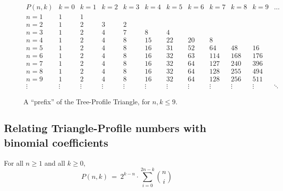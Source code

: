 \begin{figure}[htb]
\[
\begin{array}{c||r|r|r|r|r|r|r|r|r|r|r}
P(n, k) & k=0 & k=1 & k=2 & k=3 & k=4 & k=5 & k=6 & k=7 & k=8 & k=9 & \ldots \\
\hline
\hline
n=1 &  1 &  1 &    &    &     &     &     &     &     &     \\
\hline
n=2 &  1 &  2 &  3 &  2 &     &     &     &     &     &     \\
\hline
n=3 &  1 &  2 &  4 &  7 &   8 &   4 &     &     &     &     \\
\hline
n=4 &  1 &  2 &  4 &  8 &  15 &  22 &  20 &   8 &     &     \\
\hline
n=5 &  1 &  2 &  4 &  8 &  16 &  31 &  52 &  64 & 48  &  16 \\
\hline
n=6 &  1 &  2 &  4 &  8 &  16 &  32 &  63 & 114 & 168 & 176 \\
\hline
n=7 &  1 &  2 &  4 &  8 &  16 &  32 &  64 & 127 & 240 & 396 \\
\hline
n=8 &  1 &  2 &  4 &  8 &  16 &  32 &  64 & 128 & 255 & 494 \\
\hline
n=9 &  1 &  2 &  4 &  8 &  16 &  32 &  64 & 128 & 256 & 511 \\
\hline
\vdots &\vdots &\vdots &\vdots &\vdots &\vdots &\vdots &\vdots &\vdots
&\vdots &\vdots &\ddots
\end{array}
\] 
\caption{A ``prefix'' of the Tree-Profile Triangle, for $n,k \leq 9$.}
\label{fig:TP-triangle}
\end{figure}


\subsection{Relating Triangle-Profile numbers with binomial coefficients}

\begin{prop}
\label{thm:TP=sum-of-bincoeff}
For all $n \geq 1$ and all $k \geq 0$,
\begin{equation}
\label{eq:TP=sum-of-bincoeff}
P(n,k) \ = \ 2^{k-n} \cdot \sum_{i=0}^{2n-k} {n \choose i}
\end{equation}
\end{prop}

